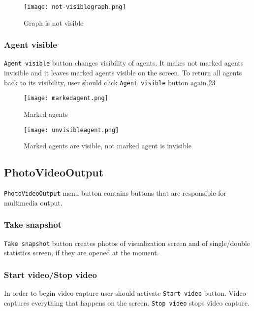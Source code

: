 \documentclass[thesis=B,english]{FITthesis}[2019/12/23]
\begin{document}
\begin{figure}
	\texttt{[image: not-visiblegraph.png]}
	\caption[Not visible graph]{Graph is not visible}\label{fig:float25}
\end{figure}

\subsubsection{Agent visible}

\verb|Agent visible| button changes visibility of agents. It makes not marked agents invisible and it leaves marked agents visible on the screen. To return all agents back to its visibility, user should click \verb|Agent visible| button again.\ref{fig:float26}\ref{fig:float27} 

\begin{figure}
	\texttt{[image: markedagent.png]}
	\caption[Marked agent]{Marked agents}\label{fig:float26}
\end{figure}

\begin{figure}
	\texttt{[image: unvisibleagent.png]}
	\caption[Visibility agents]{Marked agents are visible, not marked agent is invisible}\label{fig:float27}
\end{figure}

\subsection{PhotoVideoOutput}

\verb|PhotoVideoOutput| menu button contains buttons that are responsible for multimedia output.

\subsubsection{Take snapshot}

\verb|Take snapshot| button creates photos of visualization screen and of single/double statistics screen, if they are opened at the moment.

\subsubsection{Start video/Stop video}

In order to begin video capture user should activate \verb|Start video| button. Video captures everything that happens on the screen. \verb|Stop video| stops video capture.
\end{document}
